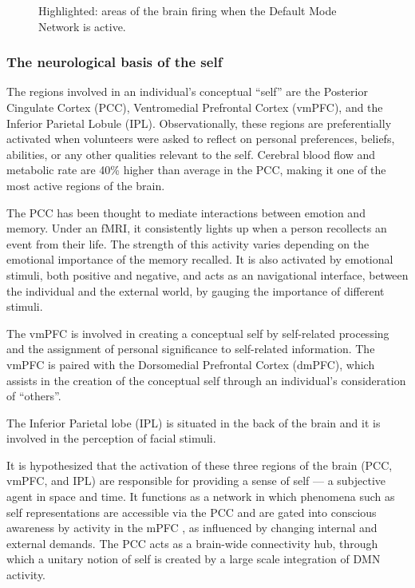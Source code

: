 \documentclass[a4paper, amsfonts, amssymb, amsmath, reprint, showkeys, nofootinbib, twoside]{revtex4-1}
\begin{document}
\begin{figure}[h!]
\begin{subfigure}[b]{0.48\linewidth}
  \end{subfigure}
  \caption{Highlighted: areas of the brain firing when the Default Mode Network is active.}
  \label{fig:dmn}
\end{figure}

\subsubsection{The neurological basis of the self}

The regions involved in an individual's conceptual ``self'' are the Posterior
Cingulate Cortex (PCC), Ventromedial Prefrontal Cortex (vmPFC), and the Inferior
Parietal Lobule (IPL). Observationally, these regions are preferentially activated when
volunteers were asked to reflect on personal preferences, beliefs, abilities, or
any other qualities relevant to the self. \cite{defaultnetworkadaptive} Cerebral
blood flow and metabolic rate are 40\% higher than average in the PCC,
making it one of the most active regions of the brain. \cite{pccrole}

The PCC has been thought to mediate interactions between emotion and memory.
Under an fMRI, it consistently lights up when a person recollects an event from their
life. The strength of this activity varies depending on the emotional importance of
the memory recalled. It is also activated by emotional stimuli,
both positive and negative, and acts as an navigational interface, between the individual
and the external world, by gauging the importance of different stimuli. \cite{pccemotion}

The vmPFC is involved in creating a conceptual self by self-related processing
and the assignment of personal significance to self-related
information. \cite{dmnself} The vmPFC is paired with the Dorsomedial Prefrontal
Cortex (dmPFC), which assists in the creation of the conceptual self through an
individual's consideration of ``others''.

The Inferior Parietal lobe (IPL) is situated in the back of the brain and it is
involved in the perception of facial stimuli. \cite{ipl}


It is hypothesized that the activation of these three regions of the brain (PCC,
vmPFC, and IPL) are responsible for providing a sense of self --- a subjective agent
in space and time. It functions as a network in which phenomena such as self
representations are accessible via the PCC \cite{mappingself} and are gated into
conscious awareness by activity in the mPFC  , as influenced by changing internal
and external demands. The PCC acts as a brain-wide connectivity hub, through which a unitary notion of self is
created by a large scale integration of DMN activity. \cite{mappingself}
\end{document}
